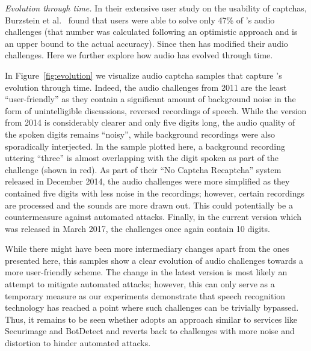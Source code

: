\emph{Evolution through time.} In their extensive user study on the usability of captchas, Burzstein et al.~\cite{captchas-are-hard}
found that users were able to solve only 47\% of \re's audio challenges (that number was calculated following an optimistic approach
and is an upper bound to the actual accuracy). Since then \re has modified their audio challenges. %
Here we further explore how audio \re has evolved through time. 

In Figure~\ref{fig:evolution} we visualize audio captcha samples
that capture \re's evolution through time. Indeed, the audio challenges from 2011 are the least ``user-friendly'' as they contain
a significant amount of background noise in the form of unintelligible discussions, reversed recordings of speech. While the version
from 2014 is considerably clearer and only five digits long, the audio quality of the spoken digits remains ``noisy'', while background recordings were
also sporadically interjected. In the sample plotted here, a background recording uttering ``three'' is almost overlapping with the
digit spoken as part of the challenge (shown in red). As part of their ``No Captcha Recaptcha'' system released in December 2014, the audio challenges were 
more simplified as they contained five digits with less noise in the recordings; however, certain recordings are processed and the sounds
are more drawn out. This could potentially be a countermeasure against automated attacks. 
Finally, in the current version which was released in March 2017,
the challenges once again contain 10 digits. 

While there might have been more intermediary changes apart from the ones presented here,
this samples show a clear evolution of audio \re challenges towards a more user-friendly scheme. The change in the latest version 
is most likely an attempt to mitigate automated attacks; however, this can only serve as a temporary measure as our experiments
demonstrate that speech recognition technology has reached a point where such challenges can be trivially bypassed. Thus, it remains 
to be seen whether \re adopts an approach similar to services like Securimage and BotDetect and reverts back to challenges with 
more noise and distortion to hinder automated attacks.
